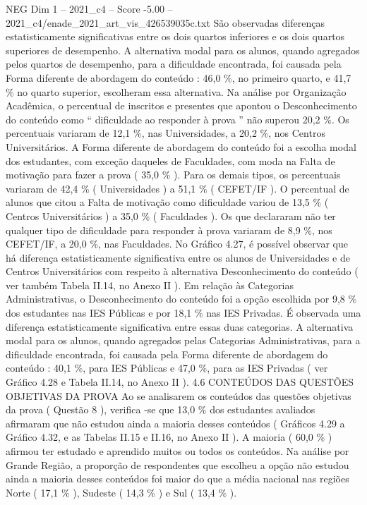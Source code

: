\begin{textsample}{NEG Dim 1 – 2021\_c4 – Score -5.00 – 2021\_c4/enade\_2021\_art\_vis\_426539035c.txt}
São observadas diferenças estatisticamente significativas entre os dois quartos inferiores e os dois quartos superiores de desempenho.
A alternativa modal para os alunos, quando agregados pelos quartos de desempenho, para a dificuldade encontrada, foi causada pela Forma diferente de abordagem do conteúdo : 46,0 \%, no primeiro quarto, e 41,7 \% no quarto superior, escolheram essa alternativa.
Na análise por Organização Acadêmica, o percentual de inscritos e presentes que apontou o Desconhecimento do conteúdo como “ dificuldade ao responder à prova ” não superou 20,2 \%.
Os percentuais variaram de 12,1 \%, nas Universidades, a 20,2 \%, nos Centros Universitários.
A Forma diferente de abordagem do conteúdo foi a escolha modal dos estudantes, com exceção daqueles de Faculdades, com moda na Falta de motivação para fazer a prova ( 35,0 \% ).
Para os demais tipos, os percentuais variaram de 42,4 \% ( Universidades ) a 51,1 \% ( CEFET/IF ).
O percentual de alunos que citou a Falta de motivação como dificuldade variou de 13,5 \% ( Centros Universitários ) a 35,0 \% ( Faculdades ).
Os que declararam não ter qualquer tipo de dificuldade para responder à prova variaram de 8,9 \%, nos CEFET/IF, a 20,0 \%, nas Faculdades.
No Gráfico 4.27, é possível observar que há diferença estatisticamente significativa entre os alunos de Universidades e de Centros Universitários com respeito à alternativa Desconhecimento do conteúdo ( ver também Tabela II.14, no Anexo II ).
Em relação às Categorias Administrativas, o Desconhecimento do conteúdo foi a opção escolhida por 9,8 \% dos estudantes nas IES Públicas e por 18,1 \% nas IES Privadas.
É observada uma diferença estatisticamente significativa entre essas duas categorias.
A alternativa modal para os alunos, quando agregados pelas Categorias Administrativas, para a dificuldade encontrada, foi causada pela Forma diferente de abordagem do conteúdo : 40,1 \%, para IES Públicas e 47,0 \%, para as IES Privadas ( ver Gráfico 4.28 e Tabela II.14, no Anexo II ). 4.6 CONTEÚDOS DAS QUESTÕES OBJETIVAS DA PROVA Ao se analisarem os conteúdos das questões objetivas da prova ( Questão 8 ), verifica -se que 13,0 \% dos estudantes avaliados afirmaram que não estudou ainda a maioria desses conteúdos ( Gráficos 4.29 a Gráfico 4.32, e as Tabelas II.15 e II.16, no Anexo II ).
A maioria ( 60,0 \% ) afirmou ter estudado e aprendido muitos ou todos os conteúdos.
Na análise por Grande Região, a proporção de respondentes que escolheu a opção não estudou ainda a maioria desses conteúdos foi maior do que a média nacional nas regiões Norte ( 17,1 \% ), Sudeste ( 14,3 \% ) e Sul ( 13,4 \% ).

\end{textsample}
